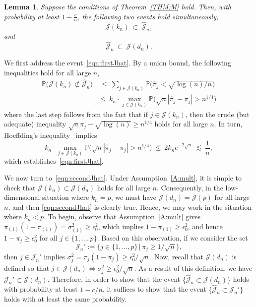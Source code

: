 \documentclass[aos,preprint]{imsart}
\numberwithin{equation}{section}
\theoremstyle{plain}
\newtheorem{lemma}{Lemma}[section]
\renewcommand{\hat}[1]{\widehat{#1}}
\newcommand{\J}{\mathcal{J}}
\renewcommand{\P}{\mathbb{P}}
\newcommand{\e}{\epsilon}
\newcommand{\ts}{\textstyle}
\newcommand{\1}{{\bf{1}}}
\newcommand{\0}{\mathbf{0}}
\begin{document}
\begin{lemma}\label{lem:Jhat}
Suppose the conditions of Theorem~\ref{THM:M} hold. Then, with probability at least $1-\frac cn$, the following two events hold simultaneously,
\begin{equation}\label{eqn:firstJhat}
\J(k_n) \ \subset \ \hat{\mathcal{J}}_n, 
\end{equation}
and
\begin{equation}\label{eqn:secondJhat}
\hat{\mathcal{J}}_n \ \subset \ \J(d_n).
\end{equation}
\end{lemma}
\proof We first address the event~\eqref{eqn:firstJhat}. By a union bound, the following inequalities hold for all large $n$,
\begin{equation}
\begin{split}
\P\Big(\J(k_n)\not\subset \hat{\mathcal{J}}_n \Big) 
%
& \ \leq \  \sum_{j\in\J(k_n)} \P\Big(\hat\pi_j <\sqrt{\log(n)/n}\Big)\\[0.3cm]
%
%
&  \leq \  k_n\cdot \max_{j\in\J(k_n)}\P\Big(\sqrt{n}|\hat\pi_j-\pi_j| >n^{1/4}\Big)
\end{split}
\end{equation}
where the last step follows from the fact that if $j\in\J(k_n)$, then the crude (but adequate) inequality $\sqrt{n}\pi_j- \sqrt{\log(n)}\geq n^{1/4}$ holds for all large $n$. In turn, Hoeffding's inequality~\cite[p.460]{vanderVaart:Wellner:2000} implies
%
$$ k_n\cdot\max_{j\in\J(k_n)}\P\Big(\sqrt{n}|\hat\pi_j-\pi_j| >n^{1/4}\Big) \ \leq \ 2k_n e^{-2\sqrt{n}} \ \lesssim \ \ts\frac{1}{n},$$
which establishes~\eqref{eqn:firstJhat}.

We now turn to~\eqref{eqn:secondJhat}. Under Assumption~\ref{A:mult}, it is simple to check that $\J(k_n)\subset\J(d_n)$ holds for all large $n$. Consequently, in the low-dimensional situation where $k_n=p$, we must have $\J(d_n)=\J(p)$ for all large $n$, and then \eqref{eqn:secondJhat} is clearly true. Hence, we may work in the situation where $k_n<p$. To  begin, observe that Assumption~\ref{A:mult} gives $\pi_{(1)}(1-\pi_{(1)})=\sigma_{(1)}^2\geq \e_0^2$, which implies $1-\pi_{(1)}\geq \e_0^2$, and hence $1-\pi_j\geq \e_0^2$ for all $j\in\{1,\dots,p\}$. Based on this observation, if we consider the set 
$$\J_n':=\Big\{j\in\{1,\dots,p\}\, \Big| \, \pi_j\geq 1/\sqrt{n}\Big\},$$
then $j\in\J_n'$ implies $\sigma_j^2=\pi_j(1-\pi_j)\geq \e_0^2/\sqrt{n}$. Now, recall that $\J(d_n)$ is defined so that $j\in\J(d_n) \Longleftrightarrow \sigma_j^2\geq \e_0^2/\sqrt{n}$. As a result of this definition, we have $\J_n'\subset\J(d_n)$. Therefore, in order to show that the event  $\{\hat\J_n\subset\J(d_n)\}$ holds with probability at least $1-c/n$, it suffices to show that the event $\{\hat\J_n\subset\J_n'\}$ holds with at least the same probability.
\end{document}
